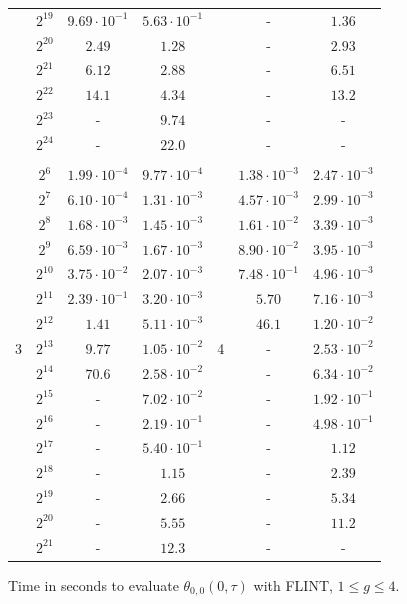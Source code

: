 \documentclass[12pt,oneside]{amsart}
\numberwithin{equation}{section}
\theoremstyle{definition}
\begin{document}
\begin{figure}
{\begin{tabular}{|c|c|cc||c|cc|}
        & $2^{19}$ & $9.69\cdot 10^{-1}$ & $5.63\cdot 10^{-1}$ & & - & $1.36$ \\
        & $2^{20}$ & $2.49$ & $1.28$ & & - & $2.93$ \\
        & $2^{21}$ & $6.12$ & $2.88$ & & - & $6.51$ \\
        & $2^{22}$ & $14.1$ & $4.34$ & & - & $13.2$ \\
        & $2^{23}$ & - & $9.74$ & & - & - \\
        & $2^{24}$ & - & $22.0$ & & - & - \\  \hline & & & & & & \\[-1em]

     & $2^6$ & $1.99\cdot 10^{-4}$ & $9.77\cdot 10^{-4}$ & & $1.38\cdot 10^{-3}$ & $2.47\cdot 10^{-3}$\\
        & $2^7$ & $6.10\cdot 10^{-4}$ & $1.31\cdot 10^{-3}$ & & $4.57\cdot 10^{-3}$  & $2.99\cdot 10^{-3}$ \\
        & $2^8$ & $1.68\cdot 10^{-3}$ & $1.45\cdot 10^{-3}$ & & $1.61\cdot 10^{-2}$ & $3.39\cdot 10^{-3}$ \\
        & $2^9$ & $6.59\cdot 10^{-3}$ &  $1.67\cdot 10^{-3}$ & &$8.90\cdot 10^{-2}$ & $3.95\cdot 10^{-3}$ \\
        & $2^{10}$ & $3.75\cdot 10^{-2}$ &  $2.07\cdot 10^{-3}$ & & $7.48\cdot 10^{-1}$ & $4.96\cdot 10^{-3}$\\
        & $2^{11}$ & $2.39\cdot 10^{-1}$ &  $3.20\cdot 10^{-3}$ & & $5.70$ & $7.16\cdot 10^{-3}$\\
        & $2^{12}$ & $1.41$ & $5.11\cdot 10^{-3}$ & & $46.1$ & $1.20\cdot 10^{-2}$ \\
    3   & $2^{13}$ & $9.77$ & $1.05\cdot 10^{-2}$ & 4 & - & $2.53\cdot 10^{-2}$ \\
        & $2^{14}$ & $70.6$ & $2.58\cdot 10^{-2}$ & & - & $6.34\cdot 10^{-2}$\\
     & $2^{15}$ & - & $7.02\cdot 10^{-2}$ & & - & $1.92\cdot 10^{-1}$ \\
        & $2^{16}$ & - & $2.19\cdot 10^{-1}$ & &- & $4.98\cdot 10^{-1}$\\
        & $2^{17}$ & -& $5.40\cdot 10^{-1}$ & & - & $1.12$ \\
        & $2^{18}$ & -& $1.15$& & - & $2.39$ \\
        & $2^{19}$ & -& $2.66$ & & - & $5.34$ \\
        & $2^{20}$ & -& $5.55$ & & - & $11.2$\\
        & $2^{21}$ & -& $12.3$ & & - & -\\ \hline
  \end{tabular}}
  \caption{Time in seconds to evaluate $\theta_{0,0}(0,\tau)$ with FLINT, $1\leq g\leq 4$.}
  \label{fig:compare-ql}
\end{figure}
\end{document}
